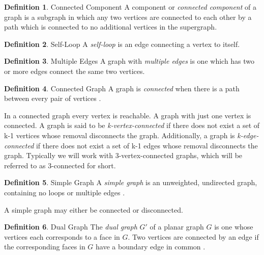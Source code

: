 \documentclass[11pt]{article}
\theoremstyle{definition}
\newtheorem{definition}{Definition}[section]
\begin{document}
	\theoremstyle{definition}
  	\begin{definition}{Connected Component}
		A component or \emph{connected component} of a graph is a subgraph in which any two vertices are connected to each other by a path which is connected to no additional vertices in the supergraph.
	\end{definition}
	
	\theoremstyle{definition}
	\begin{definition}{Self-Loop}
  		A \emph{self-loop} is an edge connecting a vertex to itself.
  	\end{definition}
	
	\theoremstyle{definition}
	\begin{definition}{Multiple Edges}
  		A graph with \emph{multiple edges} is one which has two or more edges connect the same two vertices.
	\end{definition}
	
	\theoremstyle{definition}
	\begin{definition}{Connected Graph}
		A graph is \emph{connected} when there is a path between every pair of vertices \cite{mathworld:ConnectedGraphs}. 
	\end{definition}

	In a connected graph every vertex is reachable. A graph with just one vertex is connected. 
	A graph is said to be \emph{k-vertex-connected} if there does not exist a set of k-1 vertices whose removal disconnects the graph. 
	Additionally, a graph is \emph{k-edge-connected} if there does not exist a set of k-1 edges whose removal disconnects the graph. 
	Typically we will work with 3-vertex-connected graphs, which will be referred to as 3-connected for short.

	\theoremstyle{definition}
	\begin{definition}{Simple Graph}  
  		A \emph{simple graph} is an unweighted, undirected graph, containing no loops or multiple edges \cite{mathworld:SimpleGraphs}. 
	\end{definition}
	
	A simple graph may either be connected or disconnected.
  
  	\theoremstyle{definition}
	\begin{definition}{Dual Graph}
		The \emph{dual graph} $G'$ of a planar graph $G$ is one whose vertices each corresponds to a face in $G$. 
		Two vertices are connected by an edge if the corresponding faces in $G$ have a boundary edge in common \cite{mathworld:dualGraph}. 
  	\end{definition}
	
\end{document}
